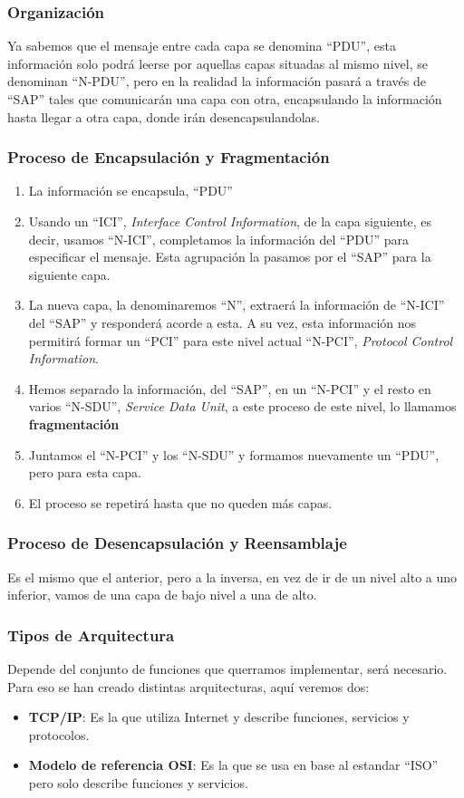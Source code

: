 \subsubsection{Organización}
\noindent Ya sabemos que el mensaje entre cada capa se denomina ``PDU'', esta información solo podrá leerse por aquellas capas situadas al mismo nivel, se denominan ``N-PDU'', pero en la realidad la información pasará a través de ``SAP'' tales que comunicarán una capa con otra, encapsulando la información hasta llegar a otra capa, donde irán desencapsulandolas.
\subsubsection{Proceso de Encapsulación y Fragmentación}
\begin{enumerate}
        \item La información se encapsula, ``PDU''
        \item Usando un ``ICI'', \textit{Interface Control Information}, de la capa siguiente, es decir, usamos ``N-ICI'', completamos la información del ``PDU'' para especificar el mensaje. Esta agrupación la pasamos por el ``SAP'' para la siguiente capa.
        \item La nueva capa, la denominaremos ``N'', extraerá la información de ``N-ICI'' del ``SAP'' y responderá acorde a esta. A su vez, esta información nos permitirá formar un ``PCI'' para este nivel actual ``N-PCI'', \textit{Protocol Control Information}.
        \item Hemos separado la información, del ``SAP'', en un ``N-PCI'' y el resto en varios ``N-SDU'', \textit{Service Data Unit}, a este proceso de este nivel, lo llamamos \textbf{fragmentación}
        \item Juntamos el ``N-PCI'' y los ``N-SDU'' y formamos nuevamente un ``PDU'', pero para esta capa.
        \item El proceso se repetirá hasta que no queden más capas.
\end{enumerate}
\subsubsection{Proceso de Desencapsulación y Reensamblaje}
\noindent Es el mismo que el anterior, pero a la inversa, en vez de ir de un nivel alto a uno inferior, vamos de una capa de bajo nivel a una de alto.
\subsubsection{Tipos de Arquitectura}
\noindent Depende del conjunto de funciones que querramos implementar, será necesario. Para eso se han creado distintas arquitecturas, aquí veremos dos:
\begin{itemize}
        \item \textbf{TCP/IP}: Es la que utiliza Internet y describe funciones, servicios y protocolos.
        \item \textbf{Modelo de referencia OSI}: Es la que se usa en base al estandar ``ISO'' pero solo describe funciones y servicios.
\end{itemize}

